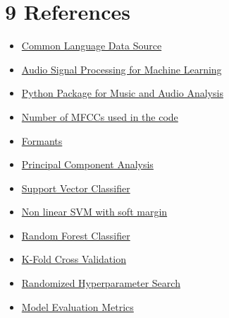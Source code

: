 \documentclass{article}
\begin{document}
\section*{9 \space References}
\begin{itemize}
    \item \href{https://huggingface.co/datasets/common_language}{Common Language Data Source}

    \item \href{https://www.youtube.com/playlist?list=PL-wATfeyAMNqIee7cH3q1bh4QJFAaeNv0}{Audio Signal Processing for Machine Learning}

    \item \href{https://librosa.org/doc/latest/index.html}{Python Package for Music and Audio Analysis}

    \item \href{https://ietresearch.onlinelibrary.wiley.com/doi/full/10.1049/tje2.12082#:~:text=All\%20performance\%20metrics\%20gave\%20the,studies\%20use\%20only\%2013\%20MFCCs}{Number of MFCCs used in the code}
    
    \item \href{}{Formants}

    \item \href{https://scikit-learn.org/stable/modules/generated/sklearn.decomposition.PCA.html}{Principal Component Analysis}
    
    \item \href{https://scikit-learn.org/stable/modules/generated/sklearn.svm.SVC.html}{Support Vector Classifier}
    
    \item \href{https://scikit-learn.org/stable/modules/svm.html#svm-kernels}{Non linear SVM with soft margin}
    
    \item \href{https://scikit-learn.org/stable/modules/generated/sklearn.ensemble.RandomForestClassifier.html}{Random Forest Classifier}

    \item \href{https://scikit-learn.org/stable/modules/generated/sklearn.model_selection.StratifiedKFold.html}{K-Fold Cross Validation}
    
    \item \href{https://scikit-learn.org/stable/modules/generated/sklearn.model_selection.RandomizedSearchCV.html}{Randomized Hyperparameter Search}
    
    \item \href{https://scikit-learn.org/stable/modules/model_evaluation.html#classification-metrics}{Model Evaluation Metrics}

\end{itemize}
\end{document}
